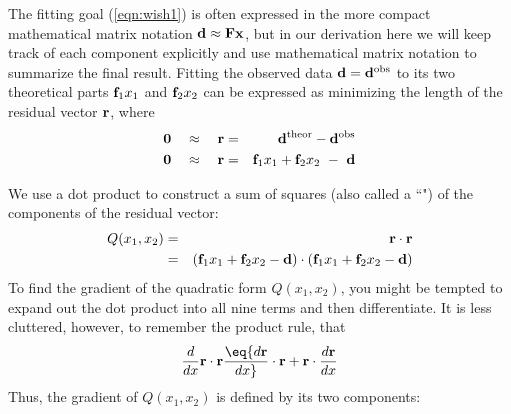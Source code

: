 \par
The fitting goal (\ref{eqn:wish1}) is often expressed in the more compact
mathematical matrix notation ${\bf d}  \approx \bold F   \bold x $,
but in our derivation here
we will keep track of each component explicitly
and use mathematical matrix notation to summarize the final result.
Fitting the observed data $\bold d = \bold d^{\rm obs}$
to its two theoretical parts
          $\bold f_1x_1$ and $\bold f_2x_2$
can be expressed
as minimizing the length of the residual vector $\bold r$, where
\begin{eqnarray}
        \bold 0 \quad\approx\quad
        \bold r &=&  \bold d^{\rm theor} -  \bold d^{\rm obs}
        \\
        \bold 0 \quad\approx\quad
        \bold r &=&  \bold f_1 x_1 + \bold f_2 x_2  \ -\ {\bf d}
        \label{eqn:resdef}
\end{eqnarray}

We use a dot product to construct a sum of squares (also called a ``")
of the components of the residual vector:
\begin{eqnarray}
Q(x_1,x_2) &=& \bold r \cdot \bold r \\
           &=&
                   ({\bf f}_1 x_1 + {\bf f}_2 x_2 - {\bf d} )
           \cdot
                   ({\bf f}_1 x_1 + {\bf f}_2 x_2 - {\bf d} )
\end{eqnarray}
To find the gradient of the quadratic form $Q(x_1,x_2)$,
you might be tempted to expand out the dot product into all nine terms
and then differentiate.
It is less cluttered, however, to remember the product rule, that
\begin{equation}
{d\over dx} \bold r \cdot \bold r
\eq
{d\bold r \over dx} \cdot \bold r
+
\bold r
\cdot
{d\bold r \over dx}
\end{equation}
Thus, the gradient of $ Q(x_1,x_2)$  is defined by its two components:

